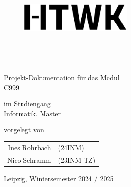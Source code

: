 
\makeatletter
\begin{titlepage}

    \begin{figure}
        \centering
        \includegraphics[width=0.5\textwidth]{../assets/htwk_logo.png}
    \end{figure}

    \centering \large
    \vspace*{-1cm}

    \university \\
    \faculty

    \vfill
 
    {\Huge \textbf{\@title \\}}

    \vspace*{1cm}
    Projekt-Dokumentation für das Modul \\
    C999 \module

    \vfill

    im Studiengang\\
    Informatik, Master

    \vspace*{1cm}
    vorgelegt von

    \begin{tabular}{rl}
        Ines Rohrbach &{\normalsize (24INM)}\\
        Nico Schramm  &{\normalsize (23INM-TZ)}
    \end{tabular}

    \vspace*{0.5cm}
    \ccbysa

    \vspace*{0.5cm}
    \prof

    \vspace*{1cm}
    Leipzig, Wintersemester 2024 / 2025

\end{titlepage}
\makeatother

